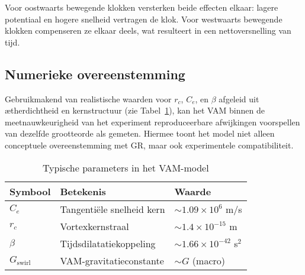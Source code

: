 Voor oostwaarts bewegende klokken versterken beide effecten elkaar: lagere potentiaal en hogere snelheid vertragen de klok. Voor westwaarts bewegende klokken compenseren ze elkaar deels, wat resulteert in een nettoversnelling van tijd.

\subsection{Numerieke overeenstemming}

Gebruikmakend van realistische waarden voor $r_c$, $C_e$, en $\beta$ afgeleid uit ætherdichtheid en kernstructuur (zie Tabel~\ref{tab:constants}), kan het VAM binnen de meetnauwkeurigheid van het experiment reproduceerbare afwijkingen voorspellen van dezelfde grootteorde als gemeten. Hiermee toont het model niet alleen conceptuele overeenstemming met GR, maar ook experimentele compatibiliteit.

\begin{table}[h!]
\centering
\caption{Typische parameters in het VAM-model}
\label{tab:constants}
\begin{tabular}{lll}
\toprule
Symbool & Betekenis & Waarde \\
\midrule
$C_e$ & Tangentiële snelheid kern & $\sim 1.09 \times 10^6$ m/s \\
$r_c$ & Vortexkernstraal & $\sim 1.4 \times 10^{-15}$ m \\
$\beta$ & Tijdsdilatatiekoppeling & $\sim 1.66 \times 10^{-42}$ s$^2$ \\
$G_{\text{swirl}}$ & VAM-gravitatieconstante & $\sim G$ (macro) \\
\bottomrule
\end{tabular}
\end{table}
